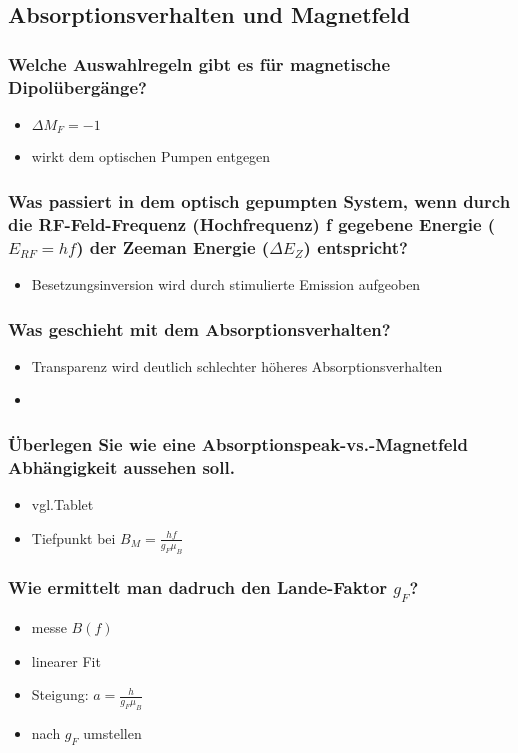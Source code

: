 \subsection{Absorptionsverhalten und Magnetfeld}
\subsubsection[]{Welche Auswahlregeln gibt es für magnetische Dipolübergänge?}
\begin{itemize}
    \item $\Delta M_F=-1$ 
    \item wirkt dem optischen Pumpen entgegen
\end{itemize}
\subsubsection[]{Was passiert in dem optisch gepumpten System, wenn durch die RF-Feld-Frequenz (Hochfrequenz) f gegebene Energie ($E_{RF}=hf$) der Zeeman Energie ($\Delta E_Z$) entspricht?}
\begin{itemize}
    \item Besetzungsinversion wird durch stimulierte Emission aufgeoben
\end{itemize}
\subsubsection[]{Was geschieht mit dem Absorptionsverhalten?}
\begin{itemize}
    \item Transparenz wird deutlich schlechter \to höheres Absorptionsverhalten
    \item 
\end{itemize}
\subsubsection[]{Überlegen Sie wie eine Absorptionspeak-vs.-Magnetfeld Abhängigkeit aussehen soll.}
\begin{itemize}
    \item vgl.Tablet
    \item Tiefpunkt bei $B_M=\frac{hf}{g_F\mu_B}$
\end{itemize}
\subsubsection[]{Wie ermittelt man dadruch den Lande-Faktor $g_F$?}
\begin{itemize}
    \item messe $B(f)$
    \item linearer Fit 
    \item Steigung: $a=\frac{h}{g_F\mu_B}$
    \item nach $g_F$ umstellen
\end{itemize}
